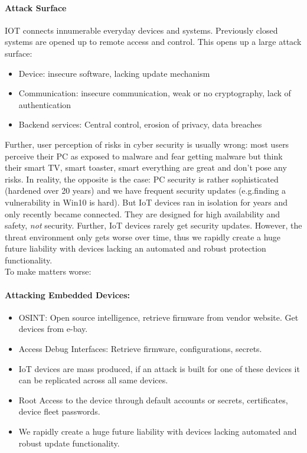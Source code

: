 \paragraph{Attack Surface}
IOT connects innumerable everyday devices and systems. Previously closed systems are opened up to remote access and control. This opens up a large attack surface:

\begin{itemize}
	\item Device: insecure software, lacking update mechanism
	\item Communication: insecure communication, weak or no cryptography, lack of authentication
	\item Backend services: Central control, erosion of privacy, data breaches
\end{itemize}

Further, user perception of risks in cyber security is usually wrong: most users perceive their PC as exposed to malware and fear getting malware but think their smart TV, smart toaster, smart everything are great and don't pose any risks. In reality, the opposite is the case: PC security is rather sophisticated (hardened over 20 years) and we have frequent security updates (e.g.finding a vulnerability in Win10 is hard). But IoT devices ran in isolation for years and only recently became connected. They are designed for high availability and safety, \textit{not} security. Further, IoT devices rarely get security updates. However, the threat environment only gets worse over time, thus we rapidly create a huge future liability with devices lacking an automated and robust protection functionality.\\
To make matters worse:

\paragraph{Attacking Embedded Devices:}
\begin{itemize}
    \item OSINT: Open source intelligence, retrieve firmware from vendor website. Get devices from e-bay.
    \item Access Debug Interfaces: Retrieve firmware, configurations, secrets.
    \item IoT devices are mass produced, if an attack is built for one of these devices it can be replicated across all same devices.
    \item Root Access to the device through default accounts or secrets, certificates, device fleet passwords.
    \item We rapidly create a huge future liability with devices lacking automated and robust update functionality.
\end{itemize}

